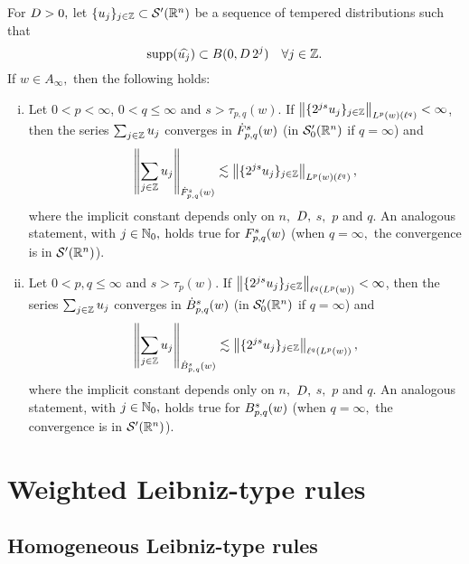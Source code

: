 \begin{theorem}\label{thm:Nikolskij:weighted} For $\A> 0,$ let $\{u_j\}_{j \in \ent} \subset \mathcal{S}'(\rn)$ be a sequence of tempered distributions such that
\begin{equation*}
\supp(\widehat{u_j}) \subset B(0, \A\, 2^j ) \quad \forall j \in \ent.
\end{equation*}
If $w\in A_\infty,$ then the following holds:  
\begin{enumerate}[(i)]
\item\label{item:thh:Nikolskij:TL} Let $0 < p < \infty$, $0 < q \leq \infty$ and $s > \tau_{p,q}(w)$. If $\norm{\{2^{js} u_j\}_{j\in\ent}}{L^p(w)(\ell^{q})} < \infty$, then the series $\sum_{j \in \ent} u_j$ converges in $\tlw{p}{s}{q}{w}$ (in $\mathcal{S}'_0(\rn)$ if $q=\infty$) and 
\begin{equation*}
\norm{\sum_{j \in \ent} u_j}{\tlw{p}{s}{q}{w}} \lesssim  \norm{\{2^{js} u_j\}_{j\in\ent}}{L^p(w)(\ell^{q})},
\end{equation*}
where the implicit constant depends only on $n,$ $\A,$ $s,$ $p$ and  $q.$  An analogous statement, with $j\in\naz,$ holds true for $\itlw{p}{s}{q}{w}$ (when $q=\infty,$  the convergence is in $\swp$).
\item\label{item:thh:Nikolskij:B} Let $0 < p, q \leq \infty$ and $s > \tau_p(w)$. If $\norm{\{2^{js} u_j\}_{j\in\ent}}{\ell^{q}(L^p(w))} < \infty$, then the series $\sum_{j \in \ent} u_j$ converges in  $\besw{p}{s}{q}{w}$ (in $\mathcal{S}'_0(\rn)$ if $q=\infty$) and 
\begin{equation*}
\norm{\sum_{j \in \ent} u_j}{\besw{p}{s}{q}{w}} \lesssim  \norm{\{2^{js} u_j\}_{j\in\ent}}{\ell^{q}(L^p(w))},
\end{equation*}
where the implicit constant depends only on $n,$ $\A,$ $s,$ $p$ and $q.$   An analogous statement, with $j\in\naz,$ holds true for $\ibesw{p}{s}{q}{w}$ (when $q=\infty,$  the convergence is in $\swp$).
\end{enumerate}
\end{theorem} 
 
 
 
 \section{Weighted Leibniz-type rules}
 
 \subsection{Homogeneous Leibniz-type rules}
 
